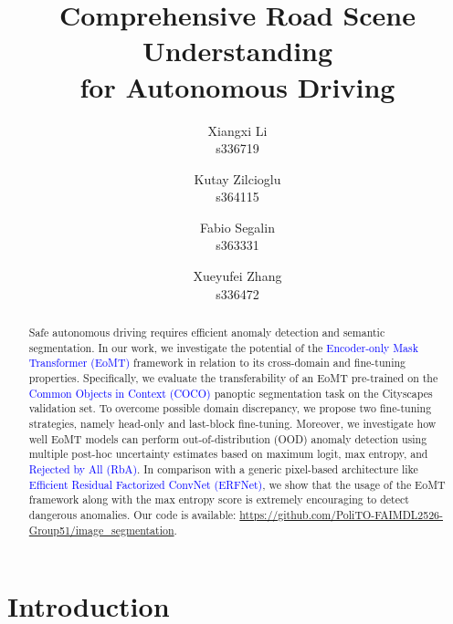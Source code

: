 \documentclass[10pt,twocolumn,letterpaper]{article}
\title{Comprehensive Road Scene Understanding\\
for Autonomous Driving}
\author{Xiangxi Li\\
s336719
\and
Kutay Zilcioglu\\
s364115
\and
Fabio Segalin\\
s363331
\and
Xueyufei Zhang\\
s336472
}
\begin{document}
\maketitle


\begin{abstract}
Safe autonomous driving requires efficient anomaly detection and semantic segmentation. In our work, we investigate the potential of the \textcolor{blue}{Encoder-only Mask Transformer (EoMT)} framework in relation to its cross-domain and fine-tuning properties. Specifically, we evaluate the transferability of an EoMT pre-trained on the \textcolor{blue}{Common Objects in Context (COCO)} panoptic segmentation task on the Cityscapes validation set. To overcome possible domain discrepancy, we propose two fine-tuning strategies, namely head-only and last-block fine-tuning. Moreover, we investigate how well EoMT models can perform out-of-distribution (OOD) anomaly detection using multiple post-hoc uncertainty estimates based on maximum logit, max entropy, and \textcolor{blue}{Rejected by All (RbA)}. In comparison with a generic pixel-based architecture like \textcolor{blue}{Efficient Residual Factorized ConvNet (ERFNet)}, we show that the usage of the EoMT framework along with the max entropy score is extremely encouraging to detect dangerous anomalies. Our code is available: \url{https://github.com/PoliTO-FAIMDL2526-Group51/image_segmentation}.
\end{abstract}



\section{Introduction}
\end{document}
